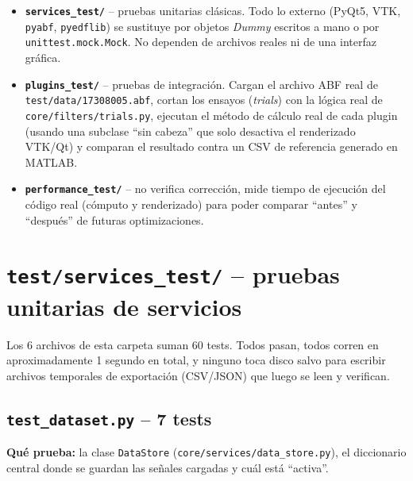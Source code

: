 \documentclass[11pt,a4paper]{article}
\begin{document}
\begin{itemize}
  \item \textbf{\texttt{services\_\allowbreak test/}} -- pruebas unitarias clásicas. Todo lo externo (PyQt5, VTK,
        \texttt{pyabf}, \texttt{pyedflib}) se sustituye por objetos \textit{Dummy} escritos a mano o por
        \texttt{unittest.mock.Mock}. No dependen de archivos reales ni de una interfaz gráfica.
  \item \textbf{\texttt{plugins\_\allowbreak test/}} -- pruebas de integración. Cargan el archivo ABF real de
        \texttt{test/data/17308005.abf}, cortan los ensayos (\textit{trials}) con la lógica real de
        \texttt{core/filters/trials.py}, ejecutan el método de cálculo real de cada plugin (usando una
        subclase ``sin cabeza'' que solo desactiva el renderizado VTK/Qt) y comparan el resultado contra un
        CSV de referencia generado en MATLAB.
  \item \textbf{\texttt{performance\_\allowbreak test/}} -- no verifica corrección, mide tiempo de ejecución del código
        real (cómputo y renderizado) para poder comparar ``antes'' y ``después'' de futuras optimizaciones.
\end{itemize}

\newpage
\section{\texttt{test/services\_\allowbreak test/} -- pruebas unitarias de servicios}

Los 6 archivos de esta carpeta suman 60 tests. Todos pasan, todos corren en aproximadamente 1 segundo en
total, y ninguno toca disco salvo para escribir archivos temporales de exportación (CSV/JSON) que luego se
leen y verifican.

\subsection{\texttt{test\_\allowbreak dataset.py} -- 7 tests}

\textbf{Qué prueba:} la clase \texttt{DataStore} (\texttt{core/services/data\_\allowbreak store.py}), el diccionario
central donde se guardan las señales cargadas y cuál está ``activa''.
\end{document}
